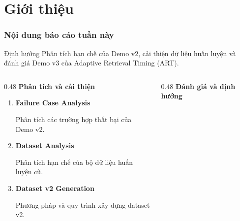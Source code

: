 
\section{Giới thiệu}

\begin{frame}
    \frametitle{Nội dung báo cáo tuần này}

    \begin{block}{Định hướng}
        \small
        Phân tích hạn chế của Demo v2, cải thiện dữ liệu huấn luyện
        và đánh giá Demo v3 của Adaptive Retrieval Timing (ART).
    \end{block}

    \vspace{0.15cm}

    \begin{columns}[T,onlytextwidth]

        \begin{column}{0.48\textwidth}
            {\small \textbf{Phân tích và cải thiện}}

            \vspace{0.1cm}

            \begin{enumerate}
                \small
                \setlength{\itemsep}{0.12cm}

                \item \textbf{Failure Case Analysis}

                {\footnotesize Phân tích các trường hợp thất bại của Demo v2.}

                \item \textbf{Dataset Analysis}

                {\footnotesize Phân tích hạn chế của bộ dữ liệu huấn luyện cũ.}

                \item \textbf{Dataset v2 Generation}

                {\footnotesize Phương pháp và quy trình xây dựng dataset v2.}
            \end{enumerate}
        \end{column}

        \begin{column}{0.48\textwidth}
            {\small \textbf{Đánh giá và định hướng}}


\end{column}
\end{columns}
\end{frame}
